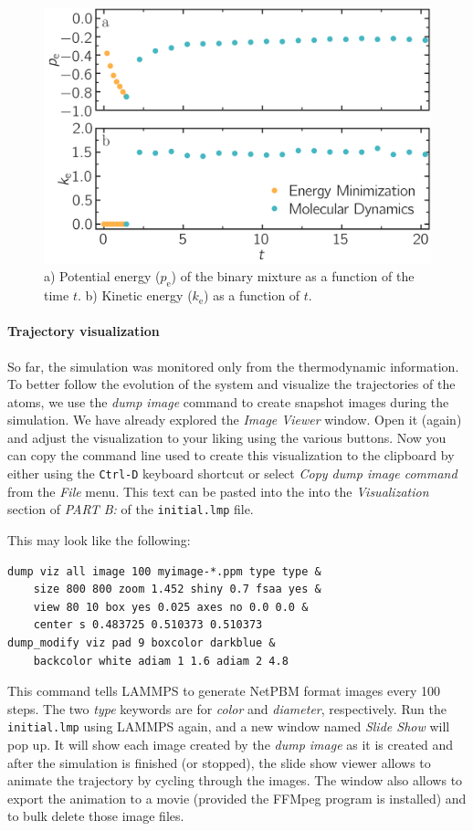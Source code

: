 \documentclass[9pt,tutorial]{livecoms}
\newcommand{\flecmd}[1]{\textcolor{command}{\texttt{#1}}} %
\begin{document}
\begin{figure}
\centering
\includegraphics[width=\linewidth]{LJ-energy}
\caption{a) Potential energy ($p_\text{e}$) of the binary mixture as a function
of the time $t$. b) Kinetic energy ($k_\text{e}$) as a function of $t$.}
\label{fig:evolution-energy}
\end{figure}

\paragraph{Trajectory visualization}

So far, the simulation was monitored only from the thermodynamic
information.  To better follow the evolution of the system and visualize
the trajectories of the atoms, we use the \textit{dump image} command to
create snapshot images during the simulation.  We have already explored
the \textit{Image Viewer} window.  Open it (again) and adjust the
visualization to your liking using the various buttons.  Now you can
copy the command line used to create this visualization to the clipboard
by either using the \texttt{Ctrl-D} keyboard shortcut or select
\textit{Copy dump image command} from the \textit{File} menu.  This text
can be pasted into the into the \textit{Visualization} section of
\textit{PART B:} of the \flecmd{initial.lmp} file.

This may look like the following:
\begin{lstlisting}
dump viz all image 100 myimage-*.ppm type type &
    size 800 800 zoom 1.452 shiny 0.7 fsaa yes &
    view 80 10 box yes 0.025 axes no 0.0 0.0 &
    center s 0.483725 0.510373 0.510373
dump_modify viz pad 9 boxcolor darkblue &
    backcolor white adiam 1 1.6 adiam 2 4.8
\end{lstlisting}
This command tells LAMMPS to generate NetPBM format images every 100
steps. The two \textit{type} keywords are for \textit{color} and
\textit{diameter}, respectively.  Run the \flecmd{initial.lmp} using
LAMMPS again, and a new window named \textit{Slide Show} will pop up.
It will show each image created by the \textit {dump image} as it is
created and after the simulation is finished (or stopped), the slide
show viewer allows to animate the trajectory by cycling through the
images.  The window also allows to export the animation to a movie
(provided the FFMpeg program is installed) and to bulk delete those
image files.
\end{document}

